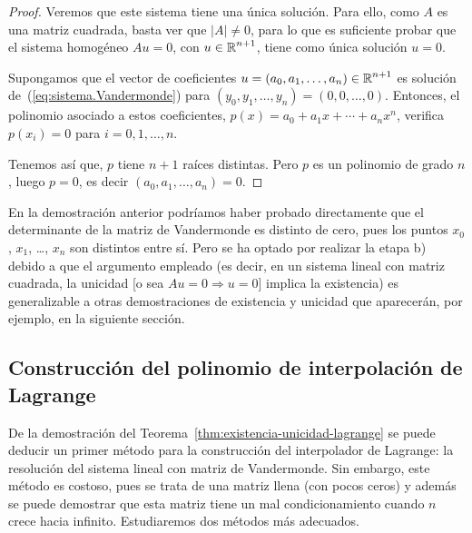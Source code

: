 \begin{proof}
     Veremos que
   este sistema tiene una única solución. Para ello, como $A$ es una
   matriz cuadrada, basta ver que $|A|\neq 0$, para lo que es suficiente
   probar que el sistema homogéneo $Au=0$, con $u\in\operatorname{{\mathbb R}}^{n+1}$, tiene
   como única solución $u=0$.

   Supongamos que el vector de coeficientes
   $u=(a_0,a_1,\dots,a_n) \in\operatorname{{\mathbb R}}^{n+1}$ es solución
   de~(\ref{eq:sistema.Vandermonde}) para
   $(y_0,y_1,\dots,y_n)=(0,0,\dots,0)$. Entonces, el polinomio
   asociado a estos coeficientes,
   $p(x)=a_0 + a_1x + \cdots + a_n x^n$, verifica $p(x_i)=0$ para
   $i=0,1,\dots,n$.

   Tenemos así que, $p$ tiene $n+1$ raíces distintas. Pero
   $p$ es un polinomio de grado $n$, luego $p=0$, es decir
   $(a_0,a_1,\dots,a_n)=0$.
 \end{proof}

 \begin{remark}
   \label{rk:1}
   En la demostración anterior podríamos haber probado directamente
   que el determinante de la matriz de Vandermonde es distinto de cero,
   pues los puntos $x_0$, $x_1$, \dots, $x_n$ son distintos
   entre sí. Pero se ha optado por realizar la etapa b) debido a que el
   argumento empleado (es decir, en un sistema lineal con matriz
   cuadrada, la unicidad [o sea $Au=0 \Rightarrow u=0$] implica la existencia)
   es generalizable a otras demostraciones de existencia y unicidad que
   aparecerán, por ejemplo, en la siguiente sección.
 \end{remark}

 \subsection{Construcción del polinomio de interpolación de Lagrange}
 \label{sec:construcion--polinomio-lagrange}

 De la demostración del Teorema~\ref{thm:existencia-unicidad-lagrange}
 se puede deducir un primer método para la construcción del
 interpolador de Lagrange: la resolución del sistema lineal con matriz
 de Vandermonde. Sin embargo, este método es costoso, pues se trata de
 una matriz llena (con pocos ceros) y además se puede demostrar que
 esta matriz tiene un mal condicionamiento cuando $n$ crece hacia
 infinito. Estudiaremos dos métodos más adecuados.

